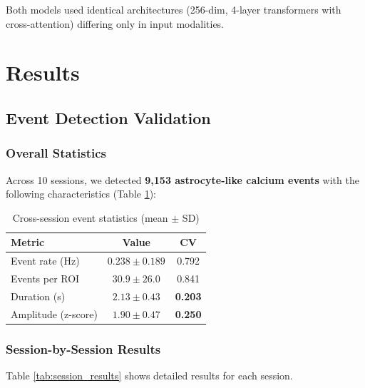 \documentclass[11pt,twocolumn]{article}
\begin{document}
Both models used identical architectures (256-dim, 4-layer transformers with cross-attention) differing only in input modalities.

\section{Results}

\subsection{Event Detection Validation}

\subsubsection{Overall Statistics}
Across 10 sessions, we detected \textbf{9,153 astrocyte-like calcium events} with the following characteristics (Table \ref{tab:event_stats}):

\begin{table}[htbp]
\centering
\caption{Cross-session event statistics (mean $\pm$ SD)}
\label{tab:event_stats}
\begin{tabular}{lcc}
\toprule
\textbf{Metric} & \textbf{Value} & \textbf{CV} \\
\midrule
Event rate (Hz) & $0.238 \pm 0.189$ & 0.792 \\
Events per ROI & $30.9 \pm 26.0$ & 0.841 \\
Duration (s) & $2.13 \pm 0.43$ & \textbf{0.203} \\
Amplitude (z-score) & $1.90 \pm 0.47$ & \textbf{0.250} \\
\bottomrule
\end{tabular}
\end{table}

\subsubsection{Session-by-Session Results}
Table \ref{tab:session_results} shows detailed results for each session.
\end{document}
